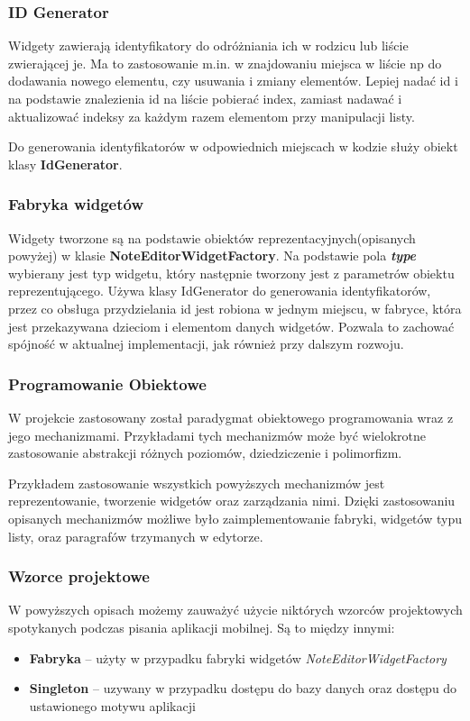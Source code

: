 \subsubsection{ID Generator}

Widgety zawierają identyfikatory do odróżniania ich w rodzicu lub liście zwierającej je. Ma to zastosowanie m.in. w znajdowaniu miejsca w liście np do dodawania nowego elementu, czy usuwania i zmiany elementów. Lepiej nadać id i na podstawie znalezienia id na liście pobierać index, zamiast nadawać i aktualizować indeksy za każdym razem elementom przy manipulacji listy.

Do generowania identyfikatorów w odpowiednich miejscach w kodzie służy obiekt klasy \textbf{IdGenerator}.

\subsubsection{Fabryka widgetów}

Widgety tworzone są na podstawie obiektów reprezentacyjnych(opisanych powyżej) w klasie \textbf{NoteEditorWidgetFactory}. Na podstawie pola \textbf{\textit{type}} wybierany jest typ widgetu, który następnie tworzony jest z parametrów obiektu reprezentującego. Używa klasy IdGenerator do generowania identyfikatorów, przez co obsługa przydzielania id jest robiona w jednym miejscu, w fabryce, która jest przekazywana dzieciom i elementom danych widgetów. Pozwala to zachować spójność w aktualnej implementacji, jak również przy dalszym rozwoju.

\subsubsection{Programowanie Obiektowe}

W projekcie zastosowany został paradygmat obiektowego programowania wraz z jego mechanizmami. Przykładami tych mechanizmów może być wielokrotne zastosowanie abstrakcji różnych poziomów, dziedziczenie i polimorfizm.

Przykładem zastosowanie wszystkich powyższych mechanizmów jest reprezentowanie, tworzenie widgetów oraz zarządzania nimi. 
Dzięki zastosowaniu opisanych mechanizmów możliwe było zaimplementowanie fabryki, widgetów typu listy, oraz paragrafów trzymanych w edytorze.

\subsubsection{Wzorce projektowe}

W powyższych opisach możemy zauważyć użycie niktórych wzorców projektowych spotykanych podczas pisania aplikacji mobilnej. Są to między innymi:

\begin{itemize}
    \item \textbf{Fabryka} -- użyty w przypadku fabryki widgetów \textit{NoteEditorWidgetFactory}
    \item \textbf{Singleton} -- uzywany w przypadku dostępu do bazy danych oraz dostępu do ustawionego motywu aplikacji
\end{itemize}


